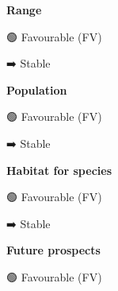 \documentclass[
  10pt,
  letterpaper,
  DIV=11,
  numbers=noendperiod]{scrartcl}
\begin{document}
\begin{figure}

\begin{minipage}{0.33\linewidth}
\textbf{Range}\end{minipage}%
%
\begin{minipage}{0.44\linewidth}
🟢 Favourable (FV)\end{minipage}%
%
\begin{minipage}{0.22\linewidth}
➡️ Stable\end{minipage}%

\end{figure}%

\begin{figure}

\begin{minipage}{0.33\linewidth}
\textbf{Population}\end{minipage}%
%
\begin{minipage}{0.44\linewidth}
🟢 Favourable (FV)\end{minipage}%
%
\begin{minipage}{0.22\linewidth}
➡️ Stable\end{minipage}%

\end{figure}%

\begin{figure}

\begin{minipage}{0.33\linewidth}
\textbf{Habitat for species}\end{minipage}%
%
\begin{minipage}{0.44\linewidth}
🟢 Favourable (FV)\end{minipage}%
%
\begin{minipage}{0.22\linewidth}
➡️ Stable\end{minipage}%

\end{figure}%

\begin{figure}

\begin{minipage}{0.33\linewidth}
\textbf{Future prospects}\end{minipage}%
%
\begin{minipage}{0.44\linewidth}
🟢 Favourable (FV)\end{minipage}%
%
\begin{minipage}{0.22\linewidth}
\end{minipage}%

\end{figure}%
\end{document}
